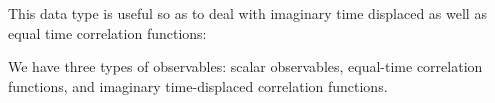 This data type is useful so as to deal with  imaginary time displaced as well as equal time correlation functions: 



We have three types of observables: scalar observables, equal-time correlation functions, and imaginary time-displaced correlation functions.


